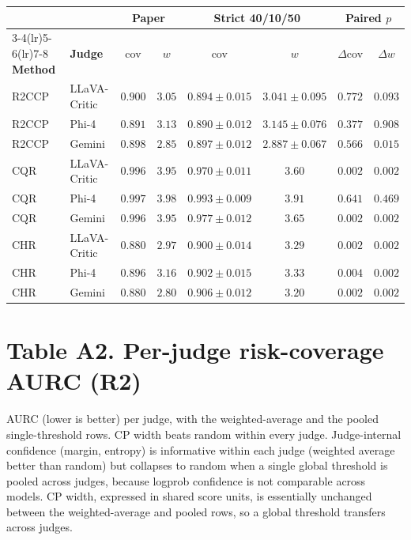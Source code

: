 \documentclass[11pt]{article}
\begin{document}
\begin{center}
\footnotesize
\setlength{\tabcolsep}{5pt}
\begin{tabular}{ll cc cc cc}
\toprule
 & & \multicolumn{2}{c}{\textbf{Paper}} & \multicolumn{2}{c}{\textbf{Strict 40/10/50}} & \multicolumn{2}{c}{\textbf{Paired $p$}} \\
\cmidrule(lr){3-4}\cmidrule(lr){5-6}\cmidrule(lr){7-8}
\textbf{Method} & \textbf{Judge} & cov & $w$ & cov & $w$ & $\Delta$cov & $\Delta w$ \\
\midrule
R2CCP & LLaVA-Critic & $0.900$ & $3.05$ & $0.894 \pm 0.015$ & $3.041 \pm 0.095$ & $0.772$ & $0.093$ \\
R2CCP & Phi-4        & $0.891$ & $3.13$ & $0.890 \pm 0.012$ & $3.145 \pm 0.076$ & $0.377$ & $0.908$ \\
R2CCP & Gemini       & $0.898$ & $2.85$ & $0.897 \pm 0.012$ & $2.887 \pm 0.067$ & $0.566$ & $0.015$ \\
\midrule
CQR   & LLaVA-Critic & $0.996$ & $3.95$ & $0.970 \pm 0.011$ & $3.60$ & $0.002$ & $0.002$ \\
CQR   & Phi-4        & $0.997$ & $3.98$ & $0.993 \pm 0.009$ & $3.91$ & $0.641$ & $0.469$ \\
CQR   & Gemini       & $0.996$ & $3.95$ & $0.977 \pm 0.012$ & $3.65$ & $0.002$ & $0.002$ \\
\midrule
CHR   & LLaVA-Critic & $0.880$ & $2.97$ & $\mathbf{0.900 \pm 0.014}$ & $3.29$ & $0.002$ & $0.002$ \\
CHR   & Phi-4        & $0.896$ & $3.16$ & $\mathbf{0.902 \pm 0.015}$ & $3.33$ & $0.004$ & $0.002$ \\
CHR   & Gemini       & $0.880$ & $2.80$ & $\mathbf{0.906 \pm 0.012}$ & $3.20$ & $0.002$ & $0.002$ \\
\bottomrule
\end{tabular}
\end{center}

\bigskip

\section*{Table A2. Per-judge risk-coverage AURC (R2)}

AURC (lower is better) per judge, with the weighted-average and the pooled
single-threshold rows. CP width beats random within every judge. Judge-internal
confidence (margin, entropy) is informative within each judge (weighted average better
than random) but collapses to random when a single global threshold is pooled across
judges, because logprob confidence is not comparable across models. CP width, expressed
in shared score units, is essentially unchanged between the weighted-average and pooled
rows, so a global threshold transfers across judges.
\end{document}
